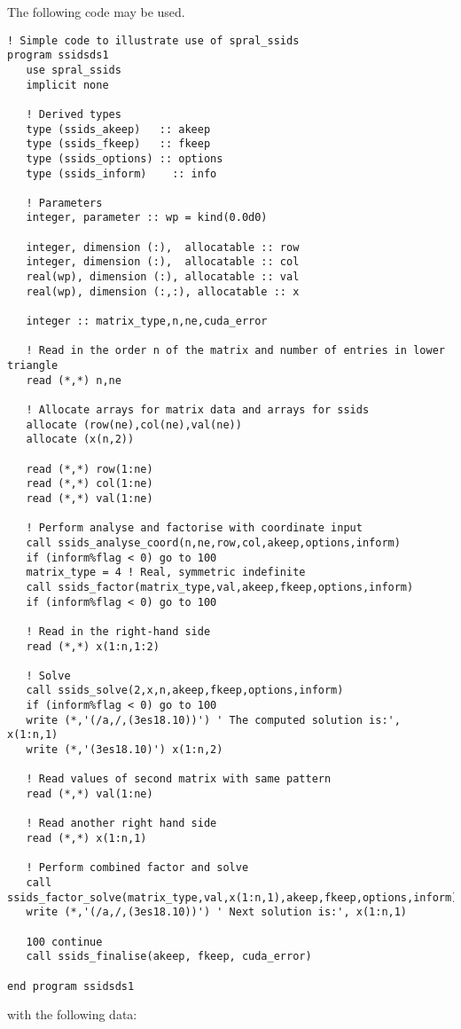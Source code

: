 \documentclass{spral}
\begin{document}
\noindent
The following code may be used.
\begin{verbatim}
! Simple code to illustrate use of spral_ssids
program ssidsds1
   use spral_ssids
   implicit none

   ! Derived types
   type (ssids_akeep)   :: akeep
   type (ssids_fkeep)   :: fkeep
   type (ssids_options) :: options
   type (ssids_inform)    :: info

   ! Parameters
   integer, parameter :: wp = kind(0.0d0)

   integer, dimension (:),  allocatable :: row
   integer, dimension (:),  allocatable :: col
   real(wp), dimension (:), allocatable :: val
   real(wp), dimension (:,:), allocatable :: x

   integer :: matrix_type,n,ne,cuda_error

   ! Read in the order n of the matrix and number of entries in lower triangle
   read (*,*) n,ne

   ! Allocate arrays for matrix data and arrays for ssids
   allocate (row(ne),col(ne),val(ne))
   allocate (x(n,2))

   read (*,*) row(1:ne)
   read (*,*) col(1:ne)
   read (*,*) val(1:ne)

   ! Perform analyse and factorise with coordinate input
   call ssids_analyse_coord(n,ne,row,col,akeep,options,inform)
   if (inform%flag < 0) go to 100
   matrix_type = 4 ! Real, symmetric indefinite
   call ssids_factor(matrix_type,val,akeep,fkeep,options,inform)
   if (inform%flag < 0) go to 100

   ! Read in the right-hand side
   read (*,*) x(1:n,1:2)

   ! Solve
   call ssids_solve(2,x,n,akeep,fkeep,options,inform)
   if (inform%flag < 0) go to 100
   write (*,'(/a,/,(3es18.10))') ' The computed solution is:', x(1:n,1)
   write (*,'(3es18.10)') x(1:n,2)

   ! Read values of second matrix with same pattern
   read (*,*) val(1:ne)

   ! Read another right hand side
   read (*,*) x(1:n,1)

   ! Perform combined factor and solve
   call ssids_factor_solve(matrix_type,val,x(1:n,1),akeep,fkeep,options,inform)
   write (*,'(/a,/,(3es18.10))') ' Next solution is:', x(1:n,1)

   100 continue
   call ssids_finalise(akeep, fkeep, cuda_error)

end program ssidsds1
\end{verbatim}
\noindent
with the following data:
\end{document}
